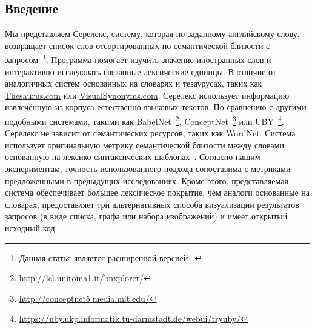 \documentclass[a4paper,10pt,twoside]{article}
\begin{document}

\author{Панченко А.И.${}^{1,2}$, Романов П.В.${}^2$, Романов А.В${}^1$, \linebreak Филиппович А.Ю.${}^2$, Филиппович Ю.Н.${}^2$, Морозова О.Д.${}^1$}




\subsection{Введение}

Мы представляем Серелекс, систему, которая по заданному английскому слову, возвращает список слов отсортированных по семантической близости с запросом~\footnote{Данная статья является расширенной версией~\cite{panchenko2013serelex}.}. Программа помогает изучить значение иностранных слов и интерактивно исследовать связанные лексические единицы. В отличие от аналогичных систем основанных на словарях и тезаурусах, таких как \url{Thesaurus.com} или \url{VisualSynonyms.com}, Серелекс использует информацию извлечённую из корпуса естественно-языковых текстов. По сравнению с другими подобными системами, такими как BabelNet~\footnote{ \url{http://lcl.uniroma1.it/bnxplorer/}}, ConceptNet~\footnote{ \url{http://conceptnet5.media.mit.edu/}} или UBY~\footnote{\url{https://uby.ukp.informatik.tu-darmstadt.de/webui/tryuby/}}, Серелекс не зависит от семантических ресурсов, таких как WordNet. Система использует оригинальную метрику семантической близости между словами основанную на лексико-синтаксических шаблонах~\cite{panchenko2012konvens}. Согласно нашим экспериментам, точность использованного подхода сопоставима с метриками предложенными в предыдущих исследованиях. Кроме этого, представляемая система обеспечивает большее лексическое покрытие, чем аналоги основанные на словарах, предоставляет три альтернативных способа визуализации результатов запросов (в виде списка, графа или набора изображений) и имеет открытый исходный код.
\end{document}
